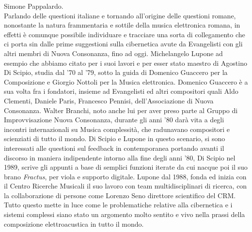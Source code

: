 Simone Pappalardo. \\
Parlando delle questioni italiane e tornando all'origine delle questioni romane,
nonostante la natura frammentaria e sottile della musica elettronica romana,
in effetti è comunque possibile individuare e tracciare una sorta di collegamento
che ci porta sin dalle prime suggestioni sulla cibernetica avute da Evangelisti
con gli altri membri di Nuova Consonanza, fino ad oggi.
Michelangelo Lupone ad esempio che abbiamo citato per i suoi lavori
e per esser stato maestro di Agostino Di Scipio, studia dal ’70 al ’79,
sotto la guida di Domenico Guaccero per la Composizione
e Giorgio Nottoli per la Musica elettronica.
Domenico Guaccero è a sua volta fra i fondatori, insieme ad Evangelisti
ed altri compositori
quali Aldo Clementi, Daniele Paris, Francesco Pennisi,
dell'Associazione di Nuova Consonanza.
Walter Branchi, noto anche lui
per aver preso parte al Gruppo di Improvvisazione Nuova Consonanza,
durante gli anni '80 darà vita a degli incontri internazionali su
Musica complessità, che radunavano compositori e scienziati di
tutto il mondo.
Di Scipio e Lupone in questo scenario, si sono interessati alle questioni
sul feedback in contemporanea
portando avanti il discorso in maniera indipendente intorno alla fine degli anni '80,
Di Scipio nel 1989, scrive gli appunti a base di semplici funzioni
iterate da cui nacque poi il suo brano 
\textit{Fractus}, per viola e supporto digitale.
Lupone dal 1988, fonda ed inizia con il Centro Ricerche Musicali il suo lavoro
con team multidisciplinari di ricerca,
con la collaborazione di persone come Lorenzo Seno direttore scientifico del CRM.
Tutto questo mette in luce come le problematiche relative alla cibernetica
e i sistemi complessi siano stato un argomento molto sentito e vivo
nella prassi della composizione elettroacustica in tutto il mondo.


\clearpage

